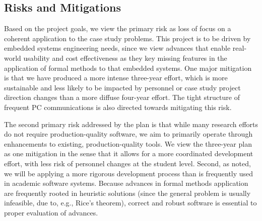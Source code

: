 \documentclass{article}
\begin{document}
\subsection{Risks and Mitigations}

Based on the project goals, we view the primary risk as loss of focus on a coherent application to the case study problems.  This project is to be driven by embedded systems engineering needs, since we view advances that enable real-world usability and cost effectiveness as they key missing features in the application of formal methods to that embedded systems.  One major mitigation is that we have produced a more intense three-year effort, which is more sustainable and less likely to be impacted by personnel or case study project direction changes than a more diffuse four-year effort.  The tight structure of frequent PC communications is also directed towards mitigating this risk.

The second primary risk addressed by the plan is that while many research efforts do not require production-quality software, we aim to primarily operate through enhancements to existing, production-quality tools.  We view the three-year plan as one mitigation in the sense that it allows for a more coordinated development effort, with less risk of personnel changes at the student level.  Second, as noted, we will be applying a more rigorous development process than is frequently used in academic software systems.  Because advances in formal methods application are frequently rooted in heuristic solutions (since the general problem is usually infeasible, due to, e.g., Rice's theorem), correct and robust software is essential to proper evaluation of advances.
\end{document}
